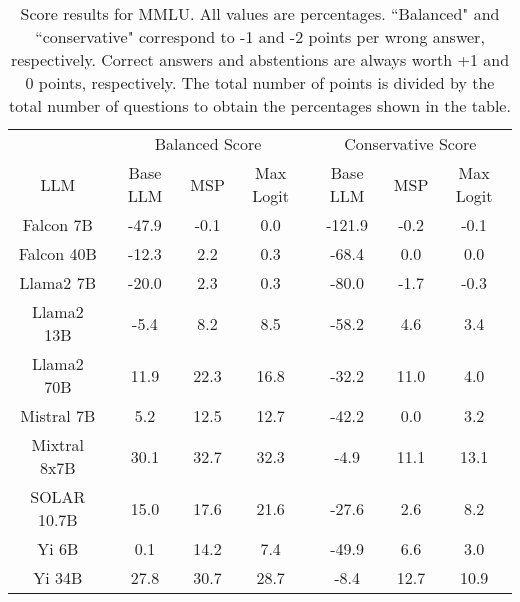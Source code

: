 \begin{table*}
\centering
\begin{tabular}{c|c|c|c|c|c|c}
& \multicolumn{3}{c|}{Balanced Score} & \multicolumn{3}{c}{Conservative Score} \\ 
LLM & Base LLM & MSP & Max Logit & Base LLM & MSP & Max Logit\\ \hline
Falcon 7B & -47.9 & -0.1 & 0.0 & -121.9 & -0.2 & -0.1\\
Falcon 40B & -12.3 & 2.2 & 0.3 & -68.4 & 0.0 & 0.0\\
Llama2 7B & -20.0 & 2.3 & 0.3 & -80.0 & -1.7 & -0.3\\
Llama2 13B & -5.4 & 8.2 & 8.5 & -58.2 & 4.6 & 3.4\\
Llama2 70B & 11.9 & 22.3 & 16.8 & -32.2 & 11.0 & 4.0\\
Mistral 7B & 5.2 & 12.5 & 12.7 & -42.2 & 0.0 & 3.2\\
Mixtral 8x7B & 30.1 & 32.7 & 32.3 & -4.9 & 11.1 & 13.1\\
SOLAR 10.7B & 15.0 & 17.6 & 21.6 & -27.6 & 2.6 & 8.2\\
Yi 6B & 0.1 & 14.2 & 7.4 & -49.9 & 6.6 & 3.0\\
Yi 34B & 27.8 & 30.7 & 28.7 & -8.4 & 12.7 & 10.9\\
\hline
\end{tabular}
\caption{Score results for MMLU. All values are percentages. ``Balanced" and ``conservative" correspond to -1 and -2 points per wrong answer, respectively. Correct answers and abstentions are always worth +1 and 0 points, respectively. The total number of points is divided by the total number of questions to obtain the percentages shown in the table.}
\label{tab:mmlu_score}
\end{table*}
